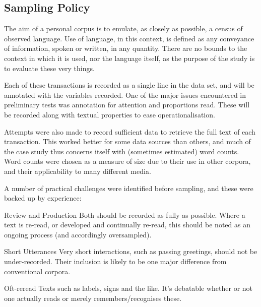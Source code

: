\subsection{Sampling Policy}
\label{sec:personal:samplingpolicy}
The aim of a personal corpus is to emulate, as closely as possible, a census of observed language.  Use of language, in this context, is defined as any conveyance of information, spoken or written, in any quantity. There are no bounds to the context in which it is used, nor the language itself, as the purpose of the study is to evaluate these very things.

Each of these transactions is recorded as a single line in the data set, and will be annotated with the variables recorded.  One of the major issues encountered in preliminary tests was annotation for attention and proportions read.  These will be recorded along with textual properties to ease operationalisation.

Attempts were also made to record sufficient data to retrieve the full text of each transaction.  This worked better for some data sources than others, and much of the case study thus concerns itself with (sometimes estimated) word counts.  Word counts were chosen as a measure of size due to their use in other corpora, and their applicability to many different media.


A number of practical challenges were identified before sampling, and these were backed up by experience:
\begin{itemizeTitle}
    \item[Review and Production] Both should be recorded as fully as possible. Where a text is re-read, or developed and continually re-read, this should be noted as an ongoing process (and accordingly oversampled).
    \item[Short Utterances] Very short interactions, such as passing greetings, should not be under-recorded. Their inclusion is likely to be one major difference from conventional corpora.
    \item[Oft-reread Texts] such as labels, signs and the like. It’s debatable whether or not one actually reads or merely remembers/recognises these. 
            
\end{itemizeTitle}
